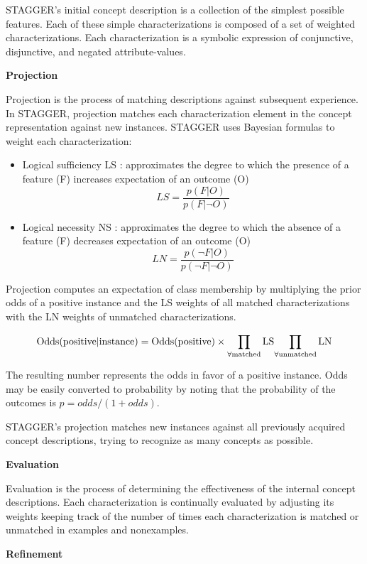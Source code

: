STAGGER's initial concept description is a collection of the simplest possible features. Each of these simple characterizations is composed of a set of weighted characterizations. Each characterization is a symbolic expression of conjunctive, disjunctive, and negated attribute-values.

 {\bf Projection}

Projection is the process of matching descriptions against subsequent experience. In STAGGER, projection matches each characterization element in the concept representation against new instances. STAGGER uses Bayesian formulas to weight each characterization: 
\begin{itemize}
\item Logical sufficiency LS : approximates the degree to which the presence of a feature (F) increases expectation of an outcome (O)
$$ LS=\frac{p(F|O)}{p(F|\neg O)}$$
\item Logical necessity NS : approximates the degree to which the absence of a feature (F) decreases expectation of an outcome (O)
$$ LN=\frac{p(\neg F|O)}{p(\neg F|\neg O)}$$
\end{itemize}

Projection computes an expectation of class membership by multiplying the prior odds of a positive instance and the LS weights of all matched characterizations with the LN weights of unmatched characterizations.

$$ \rm{Odds(positive|instance)=Odds(positive)} \times {\prod_{\forall matched} LS} {\prod_{\forall unmatched} LN} $$

The resulting number represents the odds in favor of a positive instance. Odds may be easily converted to probability by noting that the probability of the outcomes is $ p= odds/(1+odds)$.

STAGGER's projection matches new instances against all previously acquired concept descriptions, trying to recognize as many concepts as possible.

 {\bf Evaluation}

Evaluation is the process of determining the effectiveness of the internal concept descriptions. 
Each characterization is continually evaluated by adjusting its weights keeping track of the number of times each characterization  is matched or unmatched in examples and nonexamples.

{\bf Refinement}

